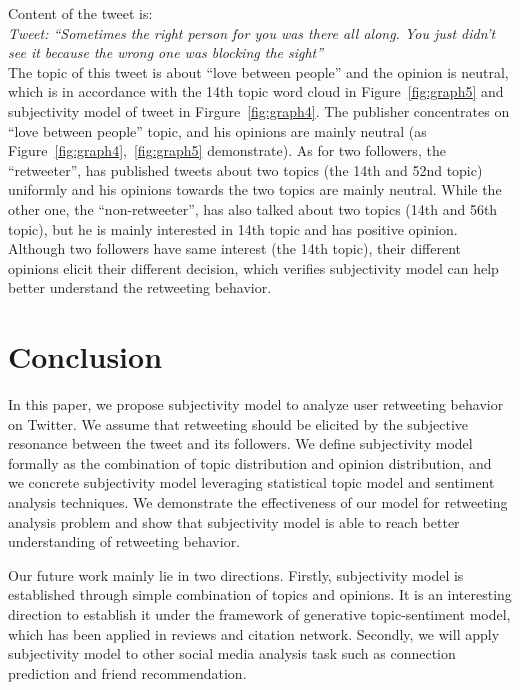 \documentclass[smallcondensed]{svjour3}     %
\begin{document}
Content of the tweet is:\\
\textit{Tweet: ``Sometimes the right person for you was there all along. You just didn’t see it because the wrong one was blocking the sight''} \\
The topic of this tweet is about ``love between people'' and the opinion is neutral, which is in accordance with the 14th topic word cloud in Figure~\ref{fig:graph5} and subjectivity model  of tweet in Firgure~\ref{fig:graph4}.
The publisher concentrates on ``love between people'' topic, and his opinions are mainly neutral (as Figure~\ref{fig:graph4},~\ref{fig:graph5} demonstrate).
As for two followers, the ``retweeter'', has published tweets about two topics (the 14th and 52nd topic) uniformly and his opinions towards the two topics are mainly neutral.
While the other one, the ``non-retweeter'', has also talked about two topics (14th and 56th topic), but he is mainly interested in 14th topic and has positive opinion.
Although two followers have same interest (the 14th topic), their different opinions elicit their different decision, which verifies subjectivity model  can help better understand the retweeting behavior.

\section{Conclusion}
In this paper, we propose subjectivity model  to analyze user retweeting behavior on Twitter. We assume that retweeting should be elicited by the subjective resonance between the tweet and its followers. 
We define subjectivity model  formally as the combination of topic distribution and opinion distribution, and we concrete subjectivity model  leveraging statistical topic model and sentiment analysis techniques.
We demonstrate the effectiveness of our model for retweeting analysis problem and show that subjectivity model  is able to reach better understanding of retweeting behavior. 

Our future work mainly lie in two directions.
Firstly, subjectivity model  is established through simple combination of topics and opinions. It is an interesting direction to establish it under the framework of generative topic-sentiment model, which has been applied in reviews and citation network.
Secondly, we will apply subjectivity model  to other social media analysis task such as connection prediction and friend recommendation.








\end{document}
